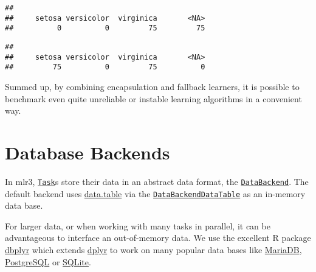\documentclass[
]{scrbook}
\newenvironment{Shaded}{\begin{snugshade}}{\end{snugshade}}
\newcommand{\AttributeTok}[1]{\textcolor[rgb]{0.77,0.63,0.00}{#1}}
\newcommand{\CommentTok}[1]{\textcolor[rgb]{0.56,0.35,0.01}{\textit{#1}}}
\newcommand{\FunctionTok}[1]{\textcolor[rgb]{0.00,0.00,0.00}{#1}}
\newcommand{\NormalTok}[1]{#1}
\newcommand{\OtherTok}[1]{\textcolor[rgb]{0.56,0.35,0.01}{#1}}
\newcommand{\SpecialCharTok}[1]{\textcolor[rgb]{0.00,0.00,0.00}{#1}}
\newcommand{\StringTok}[1]{\textcolor[rgb]{0.31,0.60,0.02}{#1}}
\renewenvironment{Shaded} {\begin{snugshade}\small} {\end{snugshade}}
\begin{document}
\begin{verbatim}
## 
##     setosa versicolor  virginica       <NA> 
##          0          0         75         75
\end{verbatim}

\begin{Shaded}
\end{Shaded}

\begin{verbatim}
## 
##     setosa versicolor  virginica       <NA> 
##         75          0         75          0
\end{verbatim}

Summed up, by combining encapsulation and fallback learners, it is possible to benchmark even quite unreliable or instable learning algorithms in a convenient way.

\hypertarget{backends}{%
\section{Database Backends}\label{backends}}

In mlr3, \href{https://mlr3.mlr-org.com/reference/Task.html}{\texttt{Task}}s store their data in an abstract data format, the \href{https://mlr3.mlr-org.com/reference/DataBackend.html}{\texttt{DataBackend}}.
The default backend uses \href{https://cran.r-project.org/package=data.table}{data.table} via the \href{https://mlr3.mlr-org.com/reference/DataBackendDataTable.html}{\texttt{DataBackendDataTable}} as an in-memory data base.

For larger data, or when working with many tasks in parallel, it can be advantageous to interface an out-of-memory data.
We use the excellent R package \href{https://cran.r-project.org/package=dbplyr}{dbplyr} which extends \href{https://cran.r-project.org/package=dplyr}{dplyr} to work on many popular data bases like \href{https://mariadb.org/}{MariaDB}, \href{https://www.postgresql.org/}{PostgreSQL} or \href{https://www.sqlite.org}{SQLite}.
\end{document}
